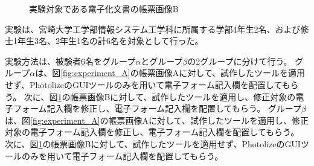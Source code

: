\begin{figure}[t]
    \begin{center}
        \caption{実験対象である電子化文書の帳票画像B}
        \label{fig:experiment_B}
    \end{center}
\end{figure}

実験は、宮崎大学工学部情報システム工学科に所属する学部4年生2名、および修士1年生3名、2年生1名の計6名を対象として行った。

実験方法は、被験者6名をグループ$\alpha$とグループ$\beta$の2グループに分けて行う。
グループ$\alpha$は、図\ref{fig:experiment_A}の帳票画像Aに対して、試作したツールを適用せず、PhotolizeのGUIツールのみを用いて電子フォーム記入欄を配置してもらう。
次に、図\ref{fig:experiment_B}の帳票画像Bに対して、試作したツールを適用し、修正対象の電子フォーム記入欄を修正し、電子フォーム記入欄を配置してもらう。
グループ$\beta$は、図\ref{fig:experiment_A}の帳票画像Aに対して、試作したツールを適用し、修正対象の電子フォーム記入欄を修正し、電子フォーム記入欄を配置してもらう。
次に、図\ref{fig:experiment_B}の帳票画像Bに対して、試作したツールを適用せず、PhotolizeのGUIツールのみを用いて電子フォーム記入欄を配置してもらう。

